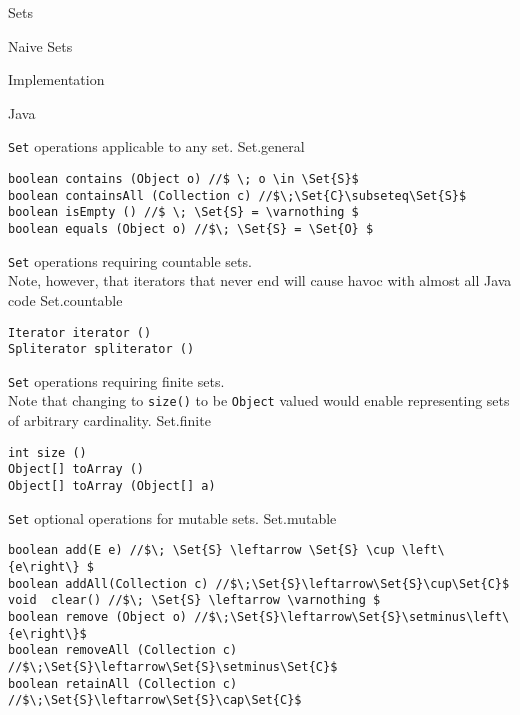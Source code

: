 \begin{plSection}{Sets}
\begin{plSection}{Naive Sets}
\begin{plSection}{Implementation}
\begin{plSection}{Java}
\begin{plListing}
{\texttt{Set}  operations applicable to any set.}
{Set.general}
\begin{lstlisting}
boolean contains (Object o) //$ \; o \in \Set{S}$
boolean containsAll (Collection c) //$\;\Set{C}\subseteq\Set{S}$ 
boolean isEmpty () //$ \; \Set{S} = \varnothing $
boolean equals (Object o) //$\; \Set{S} = \Set{O} $
\end{lstlisting}
\end{plListing}
\begin{plListing}
{\texttt{Set} operations requiring countable sets. \\
Note, however, that iterators that never end will cause 
havoc with almost all Java code}
{Set.countable}
\begin{lstlisting}
Iterator iterator ()
Spliterator spliterator ()
\end{lstlisting}
\end{plListing}
\begin{plListing}
{\texttt{Set} operations requiring finite sets. \\
Note that changing to \texttt{size()} to be \texttt{Object}
valued would enable representing sets
of arbitrary cardinality.}
{Set.finite}
\begin{lstlisting}
int size () 
Object[] toArray ()
Object[] toArray (Object[] a)
\end{lstlisting}
\end{plListing}
\begin{plListing}
{\texttt{Set} optional operations for mutable sets.}
{Set.mutable}
\begin{lstlisting}
boolean add(E e) //$\; \Set{S} \leftarrow \Set{S} \cup \left\{e\right\} $
boolean addAll(Collection c) //$\;\Set{S}\leftarrow\Set{S}\cup\Set{C}$ 
void  clear() //$\; \Set{S} \leftarrow \varnothing $ 
boolean remove (Object o) //$\;\Set{S}\leftarrow\Set{S}\setminus\left\{e\right\}$
boolean removeAll (Collection c) //$\;\Set{S}\leftarrow\Set{S}\setminus\Set{C}$ 
boolean retainAll (Collection c) //$\;\Set{S}\leftarrow\Set{S}\cap\Set{C}$
\end{lstlisting}
\end{plListing}


\end{plSection}
\end{plSection}
\end{plSection}
\end{plSection}
